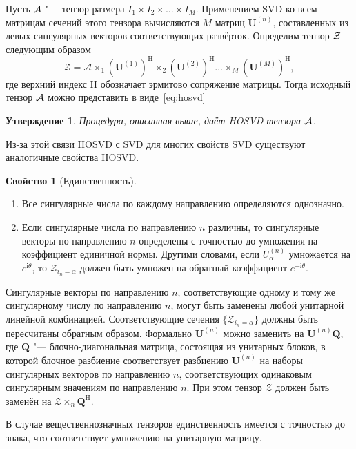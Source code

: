 \documentclass[specialist,
    substylefile = spbu.rtx,
    subf,href,colorlinks=true, 12pt]{disser}
\theoremstyle{plain}
\newtheorem{statement}{Утверждение}[section]
\theoremstyle{definition}
\newtheorem{property}{Свойство}[section]
\theoremstyle{remark}
\newcommand{\iu}{\mathrm{i}}
\begin{document}
    Пусть $\mathcal{A}$ "--- тензор размера $I_1\times I_2\times\ldots\times I_M$. 
    Применением SVD ко всем матрицам сечений этого тензора вычисляются $M$ матриц $\mathbf{U}^{(n)}$,
    составленных из левых сингулярных векторов соответствующих развёрток.
    Определим тензор $\mathcal{Z}$ следующим образом
    \[
        \mathcal{Z}=\mathcal{A}\times_1 \left(\mathbf{U}^{(1)}\right)^\mathrm{H}\times_2 \left(\mathbf{U}^{(2)}\right)^\mathrm{H}\ldots \times_M
        \left(\mathbf{U}^{(M)}\right)^\mathrm{H},
    \]
    где верхний индекс $\mathrm{H}$ обозначает эрмитово сопряжение матрицы.
    Тогда исходный тензор $\mathcal{A}$ можно представить в виде~\eqref{eq:hosvd}

    \begin{statement}
        Процедура, описанная выше, даёт HOSVD тензора $\mathcal{A}$.
        \label{state:hosvd-to-svd}
    \end{statement}

    Из-за этой связи HOSVD с SVD для многих свойств SVD существуют аналогичные свойства HOSVD\@.
    \begin{property}[Единственность]
        \leavevmode
        \begin{enumerate}
            \item Все сингулярные числа по каждому направлению определяются однозначно.
            \item Если сингулярные числа по направлению $n$ различны, то сингулярные векторы по направлению $n$ определены
            с точностью до умножения на коэффициент единичной нормы.
            Другими словами, если $U_\alpha^{(n)}$ умножается на $e^{\iu\theta}$, то $\mathcal{Z}_{i_n=\alpha}$ должен быть умножен на обратный
            коэффициент $e^{-\iu\theta}$.
        \end{enumerate}
        Сингулярные векторы по направлению $n$, соответствующие одному и тому же сингулярному числу по направлению $n$,
        могут быть заменены любой унитарной линейной комбинацией.
        Соответствующие сечения $\{\mathcal{Z}_{i_n=\alpha}\}$ должны быть пересчитаны обратным образом.
        Формально $\mathbf{U}^{(n)}$ можно заменить на $\mathbf{U}^{(n)}\mathbf{Q}$, где $\mathbf{Q}$ "--- блочно-диагональная
        матрица, состоящая из унитарных блоков, в которой блочное разбиение соответствует разбиению $\mathbf{U}^{(n)}$
        на наборы сингулярных векторов по направлению $n$, соответствующих одинаковым сингулярным значениям по направлению $n$.
        При этом тензор $\mathcal{Z}$ должен быть заменён на $\mathcal{Z}\times_{n} \mathbf{Q}^{\mathrm{H}}$.

        В случае вещественнозначных тензоров единственность имеется с точностью до знака, что соответствует
        умножению на унитарную матрицу.
    \end{property}
\end{document}
